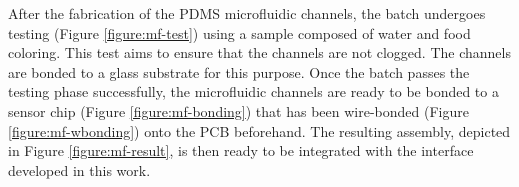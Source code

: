 After the fabrication of the \ac{PDMS} microfluidic channels, the batch undergoes testing (Figure \ref{figure:mf-test}) using a sample composed of water and food coloring. This test aims to ensure that the channels are not clogged. The channels are bonded to a glass substrate for this purpose. Once the batch passes the testing phase successfully, the microfluidic channels are ready to be bonded to a sensor chip (Figure \ref{figure:mf-bonding}) that has been wire-bonded (Figure \ref{figure:mf-wbonding}) onto the \ac{PCB} beforehand. The resulting assembly, depicted in Figure \ref{figure:mf-result}, is then ready to be integrated with the interface developed in this work.

\clearpage
\thispagestyle{empty}
\cleardoublepage
